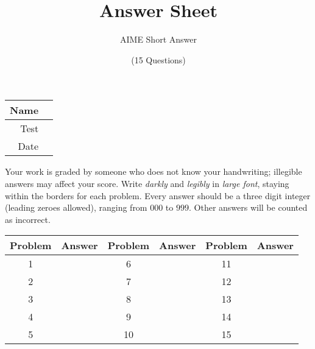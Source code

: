 \documentclass[a4paper, 12pt]{article}
\title{Answer Sheet}
\author{AIME Short Answer}
\date{(15 Questions)}
\begin{document}
\maketitle

\begin{center}
\begin{tabular}{|r|r|}
\hline
	\hspace{3em} Name & \hspace{30em} \\\hline
	Test & \qquad \\ \hline
	Date & \qquad \\ \hline
\end{tabular}
\end{center}

Your work is graded by someone who does not know your handwriting; illegible answers may affect your score. Write \emph{darkly} and \emph{legibly} in \emph{large font}, staying within the borders for each problem. Every answer should be a three digit integer (leading zeroes allowed), ranging from $000$ to $999$. Other answers will be counted as incorrect.

\begin{center}
\begin{tabularx}{\textwidth}{|c|X|c|X|c|X|}\hline
	Problem & Answer & Problem & Answer & Problem & Answer \\\hline
	1 & \hspace{13.45em} & 6 & & 11 & \\\hline
	2 & & 7 & & 12 & \\\hline
	3 & & 8 & & 13 & \\\hline
	4 & & 9 & & 14 & \\\hline
	5 & & 10 & & 15 & \\\hline
\end{tabularx}
\end{center}
\end{document}
